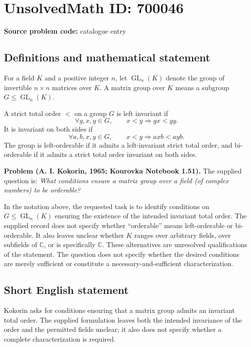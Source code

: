 \documentclass[11pt]{article}
\newcommand{\C}{\mathbb{C}}
\begin{document}
\section*{UnsolvedMath ID: 700046}
\textbf{Source problem code:} catalogue entry
\subsection{Definitions and mathematical statement}
For a field \(K\) and a positive integer \(n\), let \(\operatorname{GL}_n(K)\) denote the group of invertible \(n\times n\) matrices over \(K\). A matrix group over \(K\) means a subgroup \(G\leq\operatorname{GL}_n(K)\).

A strict total order \(<\) on a group \(G\) is left invariant if
\[
\forall g,x,y\in G,\qquad x<y\Longrightarrow gx<gy.
\]
It is invariant on both sides if
\[
\forall a,b,x,y\in G,\qquad x<y\Longrightarrow axb<ayb.
\]
The group is left-orderable if it admits a left-invariant strict total order, and bi-orderable if it admits a strict total order invariant on both sides.

\textbf{Problem (A. I. Kokorin, 1965; Kourovka Notebook 1.51).} The supplied question is: \emph{What conditions ensure a matrix group over a field (of complex numbers) to be orderable?}

In the notation above, the requested task is to identify conditions on \(G\leq\operatorname{GL}_n(K)\) ensuring the existence of the intended invariant total order. The supplied record does not specify whether ``orderable'' means left-orderable or bi-orderable. It also leaves unclear whether \(K\) ranges over arbitrary fields, over subfields of \(\C\), or is specifically \(\C\). These alternatives are unresolved qualifications of the statement. The question does not specify whether the desired conditions are merely sufficient or constitute a necessary-and-sufficient characterization.
\subsection{Short English statement}
Kokorin asks for conditions ensuring that a matrix group admits an invariant total order. The supplied formulation leaves both the intended invariance of the order and the permitted fields unclear; it also does not specify whether a complete characterization is required.
\end{document}
